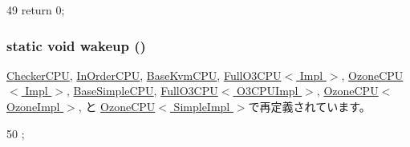 \begin{DoxyCode}
49 { return 0; }
\end{DoxyCode}
\hypertarget{classBaseCPU_a75101f8aee74078c8c3c1d1f3617f7cc}{
\subsubsection[{wakeup}]{\setlength{\rightskip}{0pt plus 5cm}static void wakeup ()}}
\label{classBaseCPU_a75101f8aee74078c8c3c1d1f3617f7cc}


\hyperlink{classCheckerCPU_ae674290a26ecbd622c5160e38e8a4fe9}{CheckerCPU}, \hyperlink{classInOrderCPU_ae674290a26ecbd622c5160e38e8a4fe9}{InOrderCPU}, \hyperlink{classBaseKvmCPU_ae674290a26ecbd622c5160e38e8a4fe9}{BaseKvmCPU}, \hyperlink{classFullO3CPU_ae674290a26ecbd622c5160e38e8a4fe9}{FullO3CPU$<$ Impl $>$}, \hyperlink{classOzoneCPU_ae674290a26ecbd622c5160e38e8a4fe9}{OzoneCPU$<$ Impl $>$}, \hyperlink{classBaseSimpleCPU_ae674290a26ecbd622c5160e38e8a4fe9}{BaseSimpleCPU}, \hyperlink{classFullO3CPU_ae674290a26ecbd622c5160e38e8a4fe9}{FullO3CPU$<$ O3CPUImpl $>$}, \hyperlink{classOzoneCPU_ae674290a26ecbd622c5160e38e8a4fe9}{OzoneCPU$<$ OzoneImpl $>$}, と \hyperlink{classOzoneCPU_ae674290a26ecbd622c5160e38e8a4fe9}{OzoneCPU$<$ SimpleImpl $>$}で再定義されています。


\begin{DoxyCode}
50 { ; }
\end{DoxyCode}


